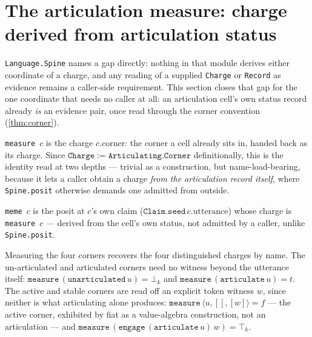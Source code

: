 \section{The articulation measure: charge derived from articulation status}

\texttt{Language.Spine} names a gap directly: nothing in that module derives
either coordinate of a charge, and any reading of a supplied \texttt{Charge}
or \texttt{Record} as evidence remains a caller-side requirement. This
section closes that gap for the one coordinate that needs no caller at all:
an articulation cell's own status record already \emph{is} an evidence pair,
once read through the corner convention (\cref{thm:corner}).

\begin{proposition}\label{thm:measure}\leanok{}
\texttt{measure}~\(c\) is the charge \(c.\mathrm{corner}\): the corner a cell
already sits in, handed back as its charge. Since \(\mathtt{Charge} :=
\mathtt{Articulating.Corner}\) definitionally, this is the identity read at
two depths --- trivial as a construction, but name-load-bearing, because it
lets a caller obtain a charge \emph{from the articulation record itself},
where \texttt{Spine.posit} otherwise demands one admitted from outside.
\end{proposition}

\begin{proposition}\label{thm:meme}\leanok{}
\texttt{meme}~\(c\) is the posit at \(c\)'s own claim
(\(\texttt{Claim.seed}\,c.\mathrm{utterance}\)) whose charge is
\texttt{measure}~\(c\) --- derived from the cell's own status, not admitted
by a caller, unlike \texttt{Spine.posit}.
\end{proposition}

\begin{proposition}\label{thm:measure-tellings}\leanok{}
Measuring the four corners recovers the four distinguished charges by name.
The un-articulated and articulated corners need no witness beyond the
utterance itself: \(\texttt{measure}\,(\texttt{unarticulated}\,u) = \bot_k\)
and \(\texttt{measure}\,(\texttt{articulate}\,u) = t\). The active and stable
corners are read off an explicit token witness \(w\), since neither is what
articulating alone produces: \(\texttt{measure}\,\langle u, [], [w]\rangle =
f\) --- the active corner, exhibited by fiat as a value-algebra construction,
not an articulation --- and \(\texttt{measure}\,(\texttt{engage}\,
(\texttt{articulate}\,u)\,w) = \top_k\).
\end{proposition}

